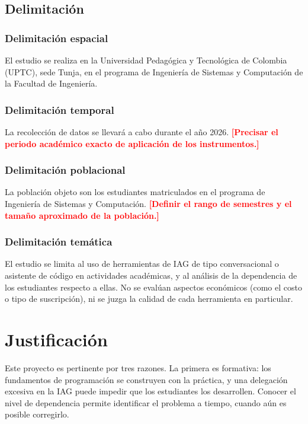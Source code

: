 \documentclass[12pt,a4paper,oneside]{report}
\newcommand{\pendiente}[1]{\textcolor{red}{\textbf{[#1]}}}
\begin{document}
\section{Delimitación}

\subsection{Delimitación espacial}

El estudio se realiza en la Universidad Pedagógica y Tecnológica de Colombia (UPTC), sede Tunja, en el programa de Ingeniería de Sistemas y Computación de la Facultad de Ingeniería.

\subsection{Delimitación temporal}

La recolección de datos se llevará a cabo durante el año 2026. \pendiente{Precisar el periodo académico exacto de aplicación de los instrumentos.}

\subsection{Delimitación poblacional}

La población objeto son los estudiantes matriculados en el programa de Ingeniería de Sistemas y Computación. \pendiente{Definir el rango de semestres y el tamaño aproximado de la población.}

\subsection{Delimitación temática}

El estudio se limita al uso de herramientas de IAG de tipo conversacional o asistente de código en actividades académicas, y al análisis de la dependencia de los estudiantes respecto a ellas. No se evalúan aspectos económicos (como el costo o tipo de suscripción), ni se juzga la calidad de cada herramienta en particular.

\chapter{Justificación}

Este proyecto es pertinente por tres razones. La primera es formativa: los fundamentos de programación se construyen con la práctica, y una delegación excesiva en la IAG puede impedir que los estudiantes los desarrollen. Conocer el nivel de dependencia permite identificar el problema a tiempo, cuando aún es posible corregirlo.
\end{document}
